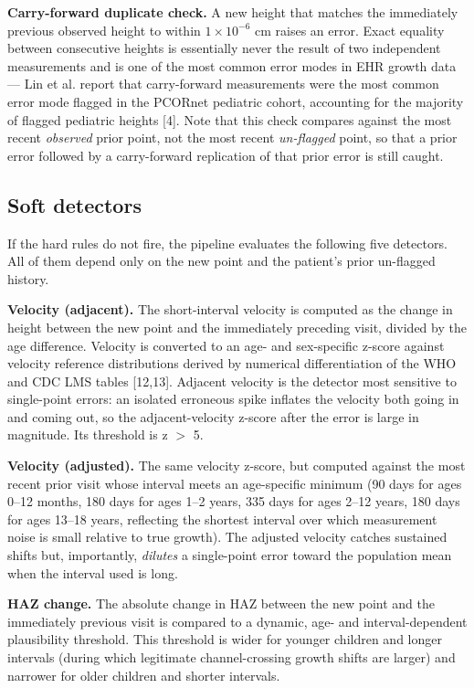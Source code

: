\documentclass[11pt]{article}
\begin{document}
\textbf{Carry-forward duplicate check.} A new height that matches the immediately previous observed height to within \(1 \times 10^{-6}\) cm raises an error. Exact equality between consecutive heights is essentially never the result of two independent measurements and is one of the most common error modes in EHR growth data --- Lin et al. report that carry-forward measurements were the most common error mode flagged in the PCORnet pediatric cohort, accounting for the majority of flagged pediatric heights [4]. Note that this check compares against the most recent \emph{observed} prior point, not the most recent \emph{un-flagged} point, so that a prior error followed by a carry-forward replication of that prior error is still caught.

\subsection{Soft detectors}\label{soft-detectors}

If the hard rules do not fire, the pipeline evaluates the following five detectors. All of them depend only on the new point and the patient's prior un-flagged history.

\textbf{Velocity (adjacent).} The short-interval velocity is computed as the change in height between the new point and the immediately preceding visit, divided by the age difference. Velocity is converted to an age- and sex-specific z-score against velocity reference distributions derived by numerical differentiation of the WHO and CDC LMS tables [12,13]. Adjacent velocity is the detector most sensitive to single-point errors: an isolated erroneous spike inflates the velocity both going in and coming out, so the adjacent-velocity z-score after the error is large in magnitude. Its threshold is \textbar z\textbar{} \(>\) 5.

\textbf{Velocity (adjusted).} The same velocity z-score, but computed against the most recent prior visit whose interval meets an age-specific minimum (90 days for ages 0--12 months, 180 days for ages 1--2 years, 335 days for ages 2--12 years, 180 days for ages 13--18 years, reflecting the shortest interval over which measurement noise is small relative to true growth). The adjusted velocity catches sustained shifts but, importantly, \emph{dilutes} a single-point error toward the population mean when the interval used is long.

\textbf{HAZ change.} The absolute change in HAZ between the new point and the immediately previous visit is compared to a dynamic, age- and interval-dependent plausibility threshold. This threshold is wider for younger children and longer intervals (during which legitimate channel-crossing growth shifts are larger) and narrower for older children and shorter intervals.
\end{document}
